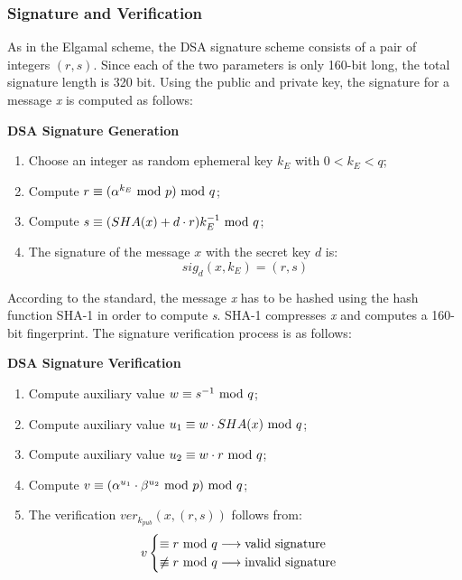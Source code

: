 \subsubsection*{Signature and Verification}
As in the Elgamal scheme, the DSA signature scheme consists of a pair of integers $(r,s)$. Since each of the two parameters is only 160-bit long, the total signature length is 320 bit. Using the public and private key, the signature for a message \textit{x} is computed as follows:
\begin{framed}
    \hfill\break\textbf{DSA Signature Generation}
    \begin{enumerate}
        \item Choose an integer as random ephemeral key $k_E$ with $0<k_E<q$;
        \item Compute $r\equiv(\alpha^{k_E}\text{ mod } p)\text{ mod } q$;
        \item Compute $s\equiv(SHA(x)+d\cdot r)k_E^{-1}\text{ mod } q$;
        \item The signature of the message $x$ with the secret key $d$ is:
        $$sig_d(x,k_E)=(r,s)$$
    \end{enumerate}
\end{framed}
According to the standard, the message \textit{x} has to be hashed using the hash function SHA-1 in order to compute \textit{s}. SHA-1 compresses \textit{x} and computes a 160-bit fingerprint. The signature verification process is as follows:
\begin{framed}
    \hfill\break\textbf{DSA Signature Verification}
    \begin{enumerate}
        \item Compute auxiliary value $w\equiv s^{-1}\text{ mod } q$;
        \item Compute auxiliary value $u_1\equiv w\cdot SHA(x)\text{ mod } q$;
        \item Compute auxiliary value $u_2\equiv w\cdot r\text{ mod } q$;
        \item Compute $v\equiv(\alpha^{u_1}\cdot \beta^{u_2}\text{ mod } p)\text{ mod } q$;
        \item The verification $ver_{k_{pub}}(x,(r,s))$ follows from:
        \begin{equation*}
            v\begin{cases}
                \equiv r\text{ mod } q\longrightarrow\text{valid signature}\\
                \not\equiv r\text{ mod } q \longrightarrow\text{invalid signature}
            \end{cases}
        \end{equation*}
    \end{enumerate}
\end{framed}


